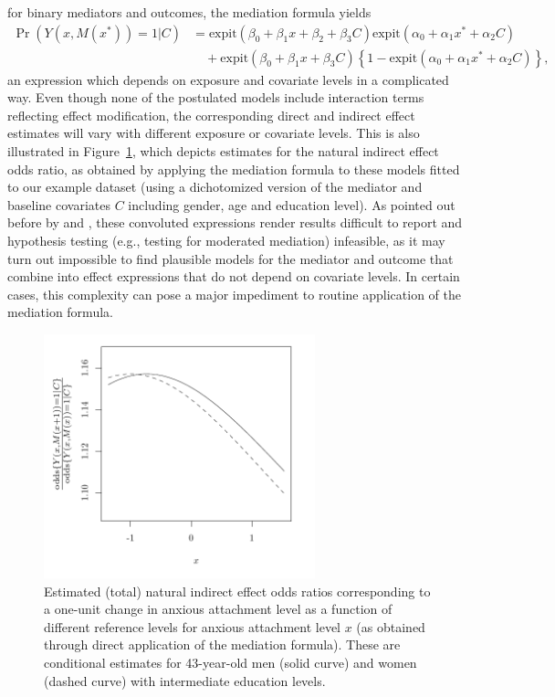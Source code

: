 \documentclass[nojss]{jss}
\begin{document}
for binary mediators and outcomes, the mediation formula yields
\begin{align*}
\Pr(Y(x,M(x^*))=1\vert C) &= \mbox{expit}\left(\beta_0 + \beta_1 x + \beta_2 + \beta_3 C\right)\mbox{expit}\left(\alpha_0 + \alpha_1 x^* + \alpha_2 C\right)\\
&\quad + \mbox{expit}\left(\beta_0 + \beta_1 x + \beta_3 C\right)\left\{1-\mbox{expit}\left(\alpha_0 + \alpha_1 x^* + \alpha_2 C\right)\right\},      
\end{align*}
an expression which depends on exposure and covariate levels in a complicated way. Even though none of the postulated models include interaction terms reflecting effect modification, the corresponding direct and indirect effect estimates will vary with different exposure or covariate levels. This is also illustrated in Figure~\ref{ill}, which depicts estimates for the natural indirect effect odds ratio, as obtained by applying the mediation formula to these models fitted to our example dataset (using a dichotomized version of the mediator and baseline covariates $C$ including gender, age and education level). As pointed out before by \cite{Lange2012} and \cite{Vansteelandt2012}, these convoluted expressions render results difficult to report and hypothesis testing (e.g., testing for moderated mediation) infeasible, as it may turn out impossible to find plausible models for the mediator and outcome that combine into effect expressions that do not depend on covariate levels. In certain cases, this complexity can pose a major impediment to routine application of the mediation formula.
\begin{figure}[t]
\centering
\includegraphics[width=0.7\textwidth]{ill.pdf}
\caption{Estimated (total) natural indirect effect odds ratios corresponding to a one-unit change in anxious attachment level as a function of different reference levels for anxious attachment level $x$ (as obtained through direct application of the mediation formula). These are conditional estimates for 43-year-old men (solid curve) and women (dashed curve) with intermediate education levels.}\label{ill}
\end{figure}
\end{document}
